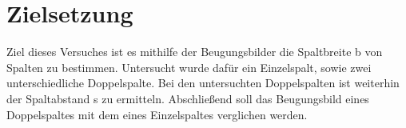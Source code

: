 \section{Zielsetzung}
\label{sec:Zielsetzung}

Ziel dieses Versuches ist es mithilfe der Beugungsbilder die Spaltbreite b von Spalten zu bestimmen.
Untersucht wurde dafür ein Einzelspalt, sowie zwei unterschiedliche Doppelspalte.
Bei den untersuchten Doppelspalten ist weiterhin der Spaltabstand s zu ermitteln.
Abschließend soll das Beugungsbild eines Doppelspaltes mit dem eines Einzelspaltes verglichen werden.
